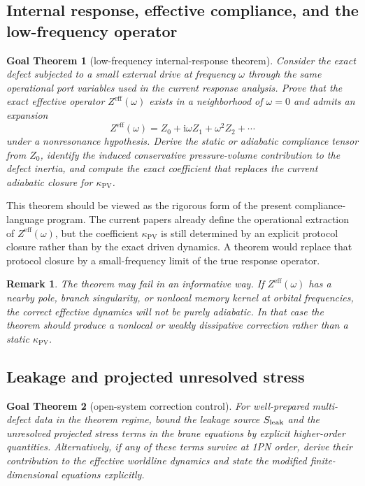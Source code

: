 \documentclass[11pt]{article}
\newcommand{\ii}{\mathrm i}
\newcommand{\kPV}{\kappa_{\mathrm{PV}}}
\newcommand{\Seff}{Z^{\mathrm{eff}}}
\newtheorem{remark}{Remark}
\newtheorem{goal}{Goal Theorem}
\begin{document}
\subsection{Internal response, effective compliance, and the low-frequency operator}

\begin{goal}[low-frequency internal-response theorem]
Consider the exact defect subjected to a small external drive at frequency $\omega$ through the same operational port variables used in the current response analysis. Prove that the exact effective operator $\Seff(\omega)$ exists in a neighborhood of $\omega=0$ and admits an expansion
\begin{equation}
  \Seff(\omega)=Z_{0}+\ii\omega Z_{1}+\omega^{2} Z_{2}+\cdots
\end{equation}
under a nonresonance hypothesis. Derive the static or adiabatic compliance tensor from $Z_{0}$, identify the induced conservative pressure-volume contribution to the defect inertia, and compute the exact coefficient that replaces the current adiabatic closure for $\kPV$.
\end{goal}

This theorem should be viewed as the rigorous form of the present compliance-language program. The current papers already define the operational extraction of $\Seff(\omega)$, but the coefficient $\kPV$ is still determined by an explicit protocol closure rather than by the exact driven dynamics. A theorem would replace that protocol closure by a small-frequency limit of the true response operator.

\begin{remark}
The theorem may fail in an informative way. If $\Seff(\omega)$ has a nearby pole, branch singularity, or nonlocal memory kernel at orbital frequencies, the correct effective dynamics will not be purely adiabatic. In that case the theorem should produce a nonlocal or weakly dissipative correction rather than a static $\kPV$.
\end{remark}

\subsection{Leakage and projected unresolved stress}

\begin{goal}[open-system correction control]
For well-prepared multi-defect data in the theorem regime, bound the leakage source $S_{\rm leak}$ and the unresolved projected stress terms in the brane equations by explicit higher-order quantities. Alternatively, if any of these terms survive at 1PN order, derive their contribution to the effective worldline dynamics and state the modified finite-dimensional equations explicitly.
\end{goal}
\end{document}
